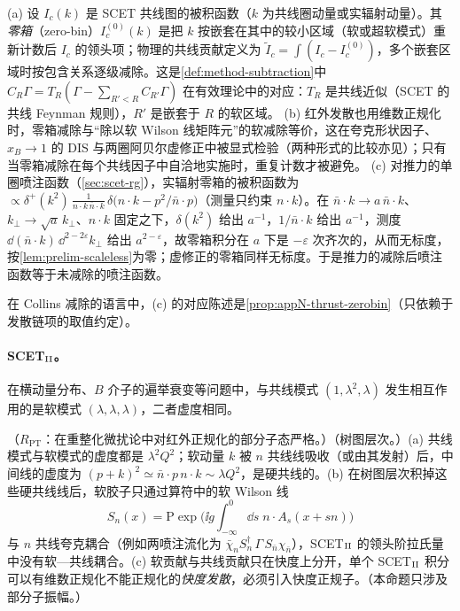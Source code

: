 \begin{definition}[零箱减除]\label{def:scet-zero-bin}
(a) 设 $I_c(k)$ 是 SCET 共线图的被积函数（$k$ 为共线圈动量或实辐射动量）。其\emph{零箱}（zero-bin）$I_c^{(0)}(k)$ 是把 $k$ 按嵌套在其中的较小区域（软或超软模式）重新计数后 $I_c$ 的领头项；物理的共线贡献定义为 $\tilde I_c=\int(I_c-I_c^{(0)})$，多个嵌套区域时按包含关系逐级减除\cite{ManoharStewart2007}。这是\cref{def:method-subtraction}中 $C_R\Gamma=T_R(\Gamma-\sum_{R'<R}C_{R'}\Gamma)$ 在有效理论中的对应：$T_R$ 是共线近似（SCET 的共线 Feynman 规则），$R'$ 是嵌套于 $R$ 的软区域。
(b) 红外发散也用维数正规化时，零箱减除与“除以软 Wilson 线矩阵元”的软减除等价，这在夸克形状因子、$x_B\to1$ 的 DIS 与两圈阿贝尔虚修正中被显式检验\cite{IdilbiMehen2007}（两种形式的比较亦见\cite{Lee:2006nr}）；只有当零箱减除在每个共线因子中自洽地实施时，重复计数才被避免。
(c) 对推力的单圈喷注函数（\cref{sec:scet-rg}），实辐射零箱的被积函数为 $\propto\delta^+(k^2)\,\frac{1}{n\cdot k\,\bar n\cdot k}\,\delta\big(n\cdot k-p^2/\bar n\cdot p\big)$（测量只约束 $n\cdot k$）。在 $\bar n\cdot k\to a\,\bar n\cdot k$、$k_\perp\to\sqrt a\,k_\perp$、$n\cdot k$ 固定之下，$\delta(k^2)$ 给出 $a^{-1}$，$1/\bar n\cdot k$ 给出 $a^{-1}$，测度 $\dd(\bar n\cdot k)\,\dd^{2-2\varepsilon}k_\perp$ 给出 $a^{2-\varepsilon}$，故零箱积分在 $a$ 下是 $-\varepsilon$ 次齐次的，从而无标度，按\cref{lem:prelim-scaleless}为零；虚修正的零箱同样无标度。于是推力的减除后喷注函数等于未减除的喷注函数。%
\end{definition}

在 Collins 减除的语言中，(c) 的对应陈述是\cref{prop:appN-thrust-zerobin}（只依赖于发散链项的取值约定）。

\paragraph{SCET$_{\rm II}$。}
在横动量分布、$B$ 介子的遍举衰变等问题中，与共线模式 $(1,\lambda^2,\lambda)$ 发生相互作用的是软模式 $(\lambda,\lambda,\lambda)$，二者虚度相同。

\begin{proposition}\label{prop:scet-scet2}
（$R_{\mathrm{PT}}$：在重整化微扰论中对红外正规化的部分子态严格。）（树图层次。）(a) 共线模式与软模式的虚度都是 $\lambda^2Q^2$；软动量 $k$ 被 $n$ 共线线吸收（或由其发射）后，中间线的虚度为 $(p+k)^2\simeq\bar n\cdot p\,n\cdot k\sim\lambda Q^2$，是硬共线的。(b) 在树图层次积掉这些硬共线线后，软胶子只通过算符中的软 Wilson 线
\begin{equation}\label{eq:scet-Sn}
S_n(x)=\mathrm P\exp\Big(\ii g\int_{-\infty}^0\dd s\;n\cdot A_s(x+sn)\Big)
\end{equation}
与 $n$ 共线夸克耦合（例如两喷注流化为 $\bar\chi_nS_n^\dagger\,\Gamma\,S_{\bar n}\chi_{\bar n}$），SCET$_{\rm II}$ 的领头阶拉氏量中没有软—共线耦合。(c) 软贡献与共线贡献只在快度上分开，单个 SCET$_{\rm II}$ 积分可以有维数正规化不能正规化的\emph{快度发散}，必须引入快度正规子\cite{Hill:2002vw,BauerEtAl2002}。（本命题只涉及部分子振幅。）
\end{proposition}

